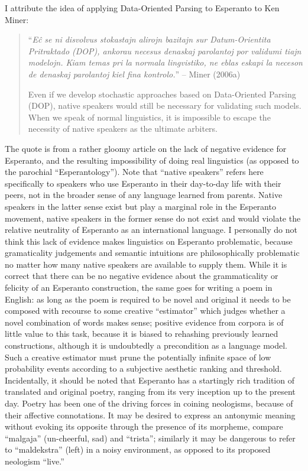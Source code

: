 \documentclass[10pt,a4paper]{article}
\begin{document}
I attribute the idea of applying Data-Oriented Parsing to Esperanto to
Ken Miner:

\begin{quote}
	``\emph{E\^c se ni disvolvus stokastajn alirojn bazitajn sur Datum-Orientita
	Pritraktado (DOP), ankorau necesus denaskaj parolantoj por validumi
	tiajn modelojn. Kiam temas pri la normala lingvistiko, ne eblas eskapi
	la neceson de denaskaj parolantoj kiel fina kontrolo.}'' -- Miner (2006a)

	Even if we develop stochastic approaches based on Data-Oriented
	Parsing (DOP), native speakers would still be necessary for validating
	such models. When we speak of normal linguistics, it is impossible
	to escape the necessity of native speakers as the ultimate arbiters.
\end{quote}

The quote is from a rather gloomy article on the lack of negative evidence
for Esperanto, and the resulting impossibility of doing real linguistics (as
opposed to the parochial ``Esperantology''). Note that ``native speakers''
refers here specifically to speakers who use Esperanto in their day-to-day
life with their peers, not in the broader sense of any language learned from
parents. Native speakers in the latter sense exist but play a marginal role in
the Esperanto movement, native speakers in the former sense do not exist and
would violate the relative neutrality of Esperanto as an international
language. I personally do not think this lack of evidence makes linguistics on
Esperanto problematic, because gramaticality judgements and semantic
intuitions are philosophically problematic no matter how many native speakers
are available to supply them. While it is correct that there can be no
negative evidence about the grammaticality or felicity of an Esperanto
construction, the same goes for writing a poem in English: as long as the poem
is required to be novel and original it needs to be composed with recourse to
some creative ``estimator'' which judges whether a novel combination of words
makes sense; positive evidence from corpora is of little value to this task,
because it is biased to rehashing previously learned constructions, although
it is undoubtedly a precondition as a language model.  Such a creative estimator must prune the
potentially infinite space of low probability events according to a subjective
aesthetic ranking and threshold. Incidentally, it should be noted that
Esperanto has a startingly rich tradition of translated and original poetry,
ranging from its very inception up to the present day.  Poetry has been one
of the driving forces in coining neologisms, because of their affective
connotations. It may be desired to express an antonymic meaning without
evoking its opposite through the presence of its morpheme, compare ``malgaja''
(un-cheerful, sad) and ``trista''; similarly it may be dangerous to refer to
``maldekstra'' (left) in a noisy environment, as opposed to its proposed
neologism ``live.''
\end{document}
